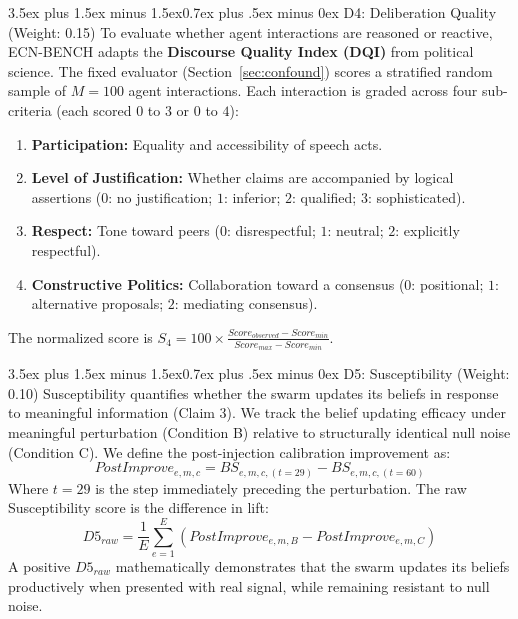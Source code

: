 \documentclass[11pt,journal,onecolumn]{IEEEtran}
\makeatletter
\renewcommand\subsection{\@startsection{subsection}{2}{\z@}%
  {3.5ex plus 1.5ex minus 1.5ex}{0.7ex plus .5ex minus 0ex}%
  {\normalfont\normalsize\bfseries}}
\makeatother
\begin{document}
\subsection{D4: Deliberation Quality (Weight: 0.15)}
To evaluate whether agent interactions are reasoned or reactive, ECN-BENCH adapts the \textbf{Discourse Quality Index (DQI)} from political science. The fixed evaluator (Section~\ref{sec:confound}) scores a stratified random sample of $M=100$ agent interactions. Each interaction is graded across four sub-criteria (each scored $0$ to $3$ or $0$ to $4$):
\begin{enumerate}
    \item \textbf{Participation:} Equality and accessibility of speech acts.
    \item \textbf{Level of Justification:} Whether claims are accompanied by logical assertions ($0$: no justification; $1$: inferior; $2$: qualified; $3$: sophisticated).
    \item \textbf{Respect:} Tone toward peers ($0$: disrespectful; $1$: neutral; $2$: explicitly respectful).
    \item \textbf{Constructive Politics:} Collaboration toward a consensus ($0$: positional; $1$: alternative proposals; $2$: mediating consensus).
\end{enumerate}
The normalized score is $S_4 = 100 \times \frac{Score_{observed} - Score_{min}}{Score_{max} - Score_{min}}$.

\subsection{D5: Susceptibility (Weight: 0.10)}
Susceptibility quantifies whether the swarm updates its beliefs in response to meaningful information (Claim 3). We track the belief updating efficacy under meaningful perturbation (Condition B) relative to structurally identical null noise (Condition C). We define the post-injection calibration improvement as:
\begin{equation}
    PostImprove_{e,m,c} = BS_{e,m,c, (t=29)} - BS_{e,m,c, (t=60)}
\end{equation}
Where $t=29$ is the step immediately preceding the perturbation. The raw Susceptibility score is the difference in lift:
\begin{equation}
    D5_{raw} = \frac{1}{E} \sum_{e=1}^E \left(PostImprove_{e,m,B} - PostImprove_{e,m,C}\right)
\end{equation}
A positive $D5_{raw}$ mathematically demonstrates that the swarm updates its beliefs productively when presented with real signal, while remaining resistant to null noise.
\end{document}
